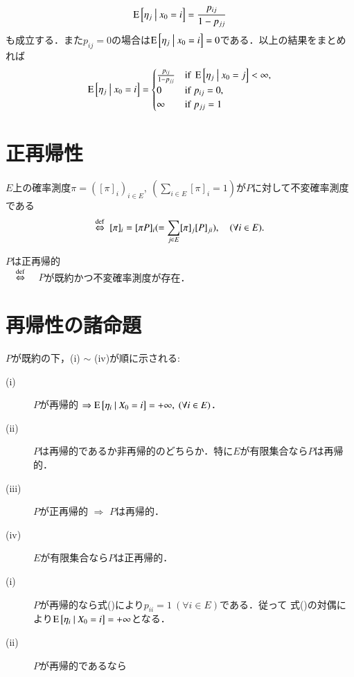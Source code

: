 \begin{prf}
\begin{align}
			\operatorname{E} \left[ \eta_j \ \middle|\ x_0 = i \right] = \frac{p_{ij}}{1 - p_{jj}}
		\end{align}
		も成立する．また$p_{ij} = 0$の場合は$\operatorname{E} \left[ \eta_j \ \middle|\ x_0 = i \right] = 0$である．以上の結果をまとめれば
		\begin{align}
			\cexp{\eta_j}{x_0 = i} = \begin{cases}
				\frac{p_{ij}}{1 - p_{jj}} & {\rm if}\ \cexp{\eta_j}{x_0 = j} < \infty, \\
				0 & {\rm if}\ p_{ij} = 0, \\
				\infty & {\rm if}\ p_{jj} = 1
			\end{cases}
		\end{align}
		\QED
	\end{prf}

\section{正再帰性}
	\begin{dfn}[不変確率測度]
		$E$上の確率測度$\pi = ([\pi]_i)_{i \in E},\ (\sum_{i \in E} [\pi]_i = 1)$が$P$に対して不変確率測度である
		\begin{align}
			\overset{\mathrm{def}}{\Leftrightarrow}\ [\pi]_i = [\pi P]_i ( = \sum_{j \in E}[\pi]_j [P]_{ji} ), \quad (\forall i \in E).
		\end{align}
	\end{dfn}
	\begin{dfn}[正再帰性]
		$P$は正再帰的 \\
		$\quad\overset{\mathrm{def}}{\Leftrightarrow}\quad$ $P$が既約かつ不変確率測度が存在． 
	\end{dfn}
\section{再帰性の諸命題}
	\begin{prp}
		$P$が既約の下，(i) $\sim$ (iv)が順に示される:
		\begin{description}
			\item[\rm{(i)}] $P$が再帰的 $\Rightarrow \operatorname{E} \left[ \eta_i \ \middle|\ X_0 = i \right] = +\infty, \ (\forall i \in E)$．
			\item[\rm{(ii)}] $P$は再帰的であるか非再帰的のどちらか．特に$E$が有限集合なら$P$は再帰的．
			\item[\rm{(iii)}] $P$が正再帰的 $\Rightarrow$ $P$は再帰的．
			\item[\rm{(iv)}] $E$が有限集合なら$P$は正再帰的．
		\end{description}
	\end{prp}
	\begin{prf}\mbox{}
		\begin{description}
			\item[\rm{(i)}] $P$が再帰的なら式()により$p_{ii}=1\ (\forall i \in E)$である．従って
				式()の対偶により$\operatorname{E} \left[ \eta_i \ \middle|\ X_0 = i \right] = +\infty$となる．
			\item[\rm{(ii)}] $P$が再帰的であるなら 
		\end{description}
	\end{prf}

